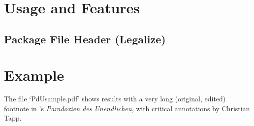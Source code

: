 \documentclass{article}%
\begin{document}
\section{Usage and Features} 
\subsection{Package File Header (Legalize)}

\section{Example}       %
The file `PdUsample.pdf' 
shows results with a very long 
(original, edited) footnote in 
's 
\textit{Paradoxien des Unendlichen}, 
with critical annotations by Christian Tapp.
\end{document}

